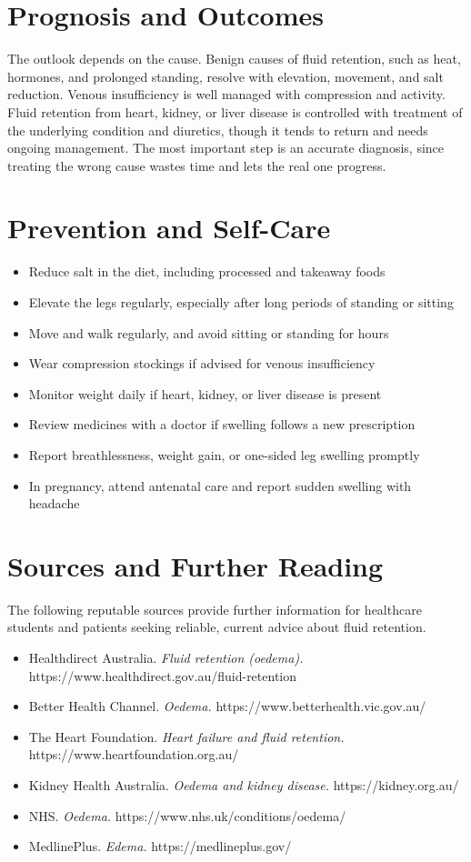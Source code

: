 \section*{Prognosis and Outcomes}
The outlook depends on the cause. Benign causes of fluid retention, such as heat, hormones, and prolonged standing, resolve with elevation, movement, and salt reduction. Venous insufficiency is well managed with compression and activity. Fluid retention from heart, kidney, or liver disease is controlled with treatment of the underlying condition and diuretics, though it tends to return and needs ongoing management. The most important step is an accurate diagnosis, since treating the wrong cause wastes time and lets the real one progress.

\section*{Prevention and Self-Care}
\begin{itemize}
    \item Reduce salt in the diet, including processed and takeaway foods
    \item Elevate the legs regularly, especially after long periods of standing or sitting
    \item Move and walk regularly, and avoid sitting or standing for hours
    \item Wear compression stockings if advised for venous insufficiency
    \item Monitor weight daily if heart, kidney, or liver disease is present
    \item Review medicines with a doctor if swelling follows a new prescription
    \item Report breathlessness, weight gain, or one-sided leg swelling promptly
    \item In pregnancy, attend antenatal care and report sudden swelling with headache
\end{itemize}

\section*{Sources and Further Reading}
The following reputable sources provide further information for healthcare students and patients seeking reliable, current advice about fluid retention.
\begin{itemize}
    \item Healthdirect Australia. \textit{Fluid retention (oedema).} https://www.healthdirect.gov.au/fluid-retention
    \item Better Health Channel. \textit{Oedema.} https://www.betterhealth.vic.gov.au/
    \item The Heart Foundation. \textit{Heart failure and fluid retention.} https://www.heartfoundation.org.au/
    \item Kidney Health Australia. \textit{Oedema and kidney disease.} https://kidney.org.au/
    \item NHS. \textit{Oedema.} https://www.nhs.uk/conditions/oedema/
    \item MedlinePlus. \textit{Edema.} https://medlineplus.gov/
\end{itemize}
